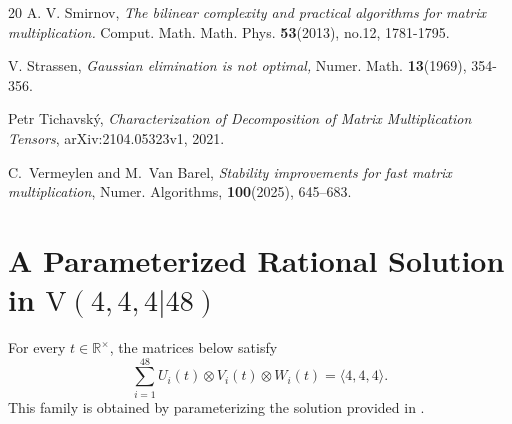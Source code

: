 \documentclass[reqno]{amsart}
\theoremstyle{definition}
\numberwithin{equation}{section}
\theoremstyle{remark}
\begin{document}
\begin{thebibliography}{20}
A. V. Smirnov, \textit{The bilinear complexity and practical algorithms for matrix multiplication.} Comput. Math. Math. Phys. \textbf{53}(2013), no.12, 1781-1795.

V. Strassen, \textit{Gaussian elimination is not optimal,} Numer. Math. \textbf{13}(1969), 354-356.

Petr Tichavsk\'{y}, \emph{Characterization of Decomposition of Matrix Multiplication Tensors}, arXiv:2104.05323v1, 2021.

C.~Vermeylen and M.~Van Barel,
\emph{Stability improvements for fast matrix multiplication},
Numer. Algorithms, \textbf{100}(2025), 645--683.



\end{thebibliography}


\appendix
\section{A Parameterized Rational Solution in $\mathrm{V}(4,4,4|48)$}
\label{sec-app}

For every $t\in\mathbb{R}^{\times}$, the matrices below satisfy
$$
\sum_{i=1}^{48} U_i(t)\otimes V_i(t)\otimes W_i(t)
=\langle4,4,4\rangle.$$ 
This family is obtained by parameterizing the solution provided in
\cite{dumas25}.
\end{document}
